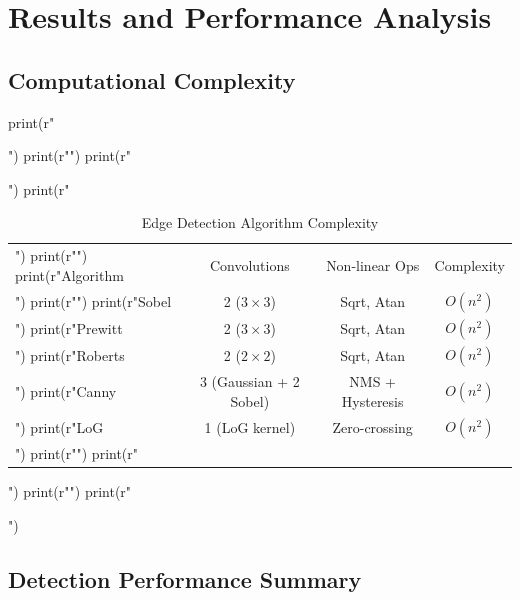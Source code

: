 \documentclass[a4paper, 11pt]{article}
\begin{document}
\section{Results and Performance Analysis}

\subsection{Computational Complexity}

\begin{pycode}
print(r"\begin{table}[htbp]")
print(r"\centering")
print(r"\caption{Edge Detection Algorithm Complexity}")
print(r"\begin{tabular}{lccc}")
print(r"\toprule")
print(r"Algorithm & Convolutions & Non-linear Ops & Complexity \\")
print(r"\midrule")
print(r"Sobel & 2 ($3\times3$) & Sqrt, Atan & $O(n^2)$ \\")
print(r"Prewitt & 2 ($3\times3$) & Sqrt, Atan & $O(n^2)$ \\")
print(r"Roberts & 2 ($2\times2$) & Sqrt, Atan & $O(n^2)$ \\")
print(r"Canny & 3 (Gaussian + 2 Sobel) & NMS + Hysteresis & $O(n^2)$ \\")
print(r"LoG & 1 (LoG kernel) & Zero-crossing & $O(n^2)$ \\")
print(r"\bottomrule")
print(r"\end{tabular}")
print(r"\label{tab:complexity}")
print(r"\end{table}")
\end{pycode}

\subsection{Detection Performance Summary}
\end{document}
